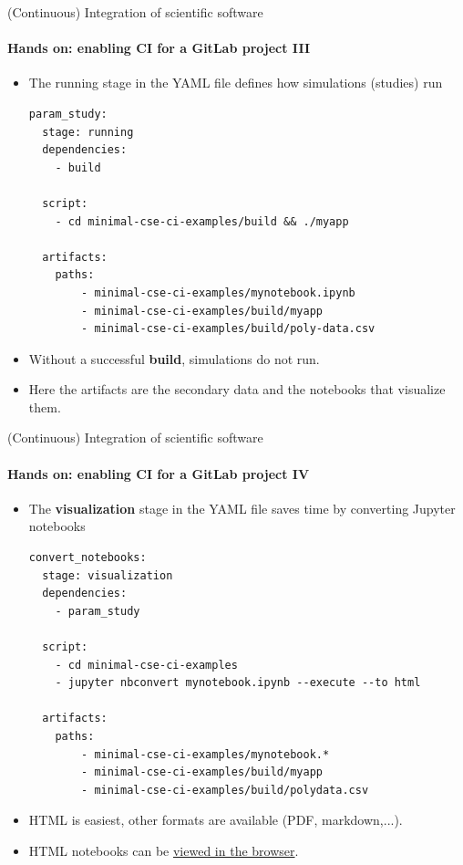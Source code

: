 \begin{frame}[fragile]{(Continuous) Integration of scientific software} 
    \framesubtitle{Hands on: enabling CI for a GitLab project III} 
    \vfill

    \begin{itemize}
        \item The running stage in the YAML file defines how simulations (studies) run 
            \begin{verbatim}
param_study:
  stage: running
  dependencies:
    - build
      
  script: 
    - cd minimal-cse-ci-examples/build && ./myapp

  artifacts:
    paths:
        - minimal-cse-ci-examples/mynotebook.ipynb
        - minimal-cse-ci-examples/build/myapp
        - minimal-cse-ci-examples/build/poly-data.csv
            \end{verbatim}
        \item Without a successful \textbf{build}, simulations do not run. 
        \item Here the artifacts are the secondary data and the notebooks that visualize them.
    \end{itemize}

\end{frame}

\begin{frame}[fragile]{(Continuous) Integration of scientific software} 
    \framesubtitle{Hands on: enabling CI for a GitLab project IV} 
    \vfill

    \begin{itemize}
        \item The \textbf{visualization} stage in the YAML file saves time by converting Jupyter notebooks 
            \begin{verbatim}
convert_notebooks:
  stage: visualization 
  dependencies:
    - param_study

  script:
    - cd minimal-cse-ci-examples 
    - jupyter nbconvert mynotebook.ipynb --execute --to html 

  artifacts:
    paths:
        - minimal-cse-ci-examples/mynotebook.*
        - minimal-cse-ci-examples/build/myapp
        - minimal-cse-ci-examples/build/polydata.csv
            \end{verbatim}
        \item HTML is easiest, other formats are available (PDF, markdown,...).
        \item HTML notebooks can be \href{https://gitlab.com/tmaric/minimal-cse-ci-examples/-/pipelines}{viewed in the browser}. 
    \end{itemize}
\end{frame}

